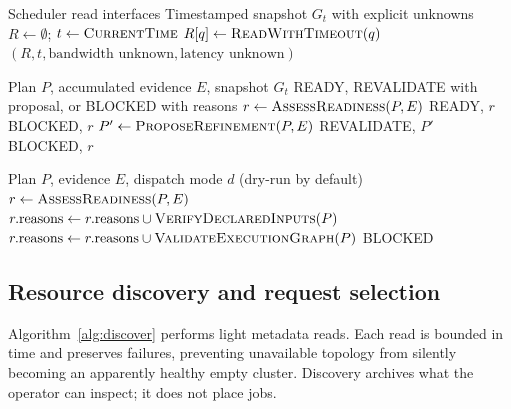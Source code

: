 \documentclass[pdflatex,sn-mathphys-num]{sn-jnl}
\theoremstyle{thmstylethree}
\begin{document}
\begin{algorithm}[H]
\caption{DiscoverClusterTopology: archive resource observations}\label{alg:discover}
\begin{algorithmic}[1]
\Require Scheduler read interfaces
\Ensure Timestamped snapshot $G_t$ with explicit unknowns
\State $R\gets\emptyset$; $t\gets\Call{CurrentTime}{}$
\State $R[q]\gets\Call{ReadWithTimeout}{q}$ 
\EndFor
\State \Return $(R,t,\text{bandwidth unknown},\text{latency unknown})$
\end{algorithmic}
\end{algorithm}
\begin{algorithm}[H]
\caption{ExecuteSmokeTestLoop: assess a bounded iteration}\label{alg:smoke}
\begin{algorithmic}[1]
\Require Plan $P$, accumulated evidence $E$, snapshot $G_t$
\Ensure READY, REVALIDATE with proposal, or BLOCKED with reasons
\State {} 
\State $r\gets\Call{AssessReadiness}{P,E}$ 
 \State \Return READY, $r$ \EndIf
{} \State \Return BLOCKED, $r$ \EndIf
\State $P'\gets\Call{ProposeRefinement}{P,E}$
\State \Return REVALIDATE, $P'$ 
\EndIf
\State \Return BLOCKED, $r$ 
\end{algorithmic}
\end{algorithm}
\begin{algorithm}[H]
\caption{OrchestrateFullExperiment: operator-facing dispatch}\label{alg:dispatch}
\begin{algorithmic}[1]
\Require Plan $P$, evidence $E$, dispatch mode $d$ (dry-run by default)
\State $r\gets\Call{AssessReadiness}{P,E}$
\State $r.\mathrm{reasons}\gets r.\mathrm{reasons}\cup\Call{VerifyDeclaredInputs}{P}$
\State $r.\mathrm{reasons}\gets r.\mathrm{reasons}\cup\Call{ValidateExecutionGraph}{P}$
\State {}
 \State \Return BLOCKED \EndIf
\State \Return {} 
\end{algorithmic}
\end{algorithm}

\subsection{Resource discovery and request selection}
Algorithm~\ref{alg:discover} performs light metadata reads. Each read is bounded in time and preserves failures, preventing unavailable topology from silently becoming an apparently healthy empty cluster. Discovery archives what the operator can inspect; it does not place jobs.
\end{document}
